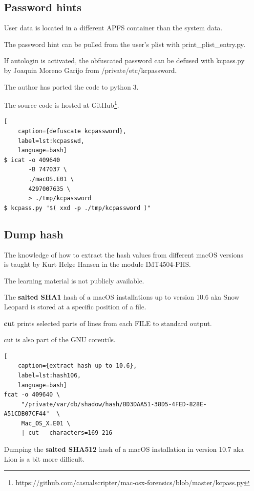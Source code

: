 \subsection{Password hints}

User data is located in a different APFS container than the system data.

The password hint can be pulled from the user's plist with print\_plist\_entry.py.

If autologin is activated, the obfuscated password can be defused with kcpass.py by Joaquin Moreno Garijo from /private/etc/kcpassword.

The author has ported the code to python 3.

The source code is hosted at GitHub\footnote{https://github.com/casualscripter/mac-osx-forensics/blob/master/kcpass.py}.

\begin{lstlisting}[
    caption={defuscate kcpassword},
    label=lst:kcpasswd,
    language=bash]
$ icat -o 409640 
       -B 747037 \
       ./macOS.E01 \
       4297007635 \
       > ./tmp/kcpassword
$ kcpass.py "$( xxd -p ./tmp/kcpassword )"
\end{lstlisting}

\subsection{Dump hash}

The knowledge of how to extract the hash values from different macOS versions is taught by Kurt Helge Hansen in the module IMT4504-PHS.

The learning material is not publicly available.

The \textbf{salted SHA1} hash of a macOS installations up to version 10.6 aka Snow Leopard is stored at a specific position of a file.

\textbf{cut} prints selected parts of lines from each FILE to standard output.

cut is also part of the GNU coreutils.

\begin{lstlisting}[
    caption={extract hash up to 10.6},
    label=lst:hash106,
    language=bash]
fcat -o 409640 \
     "/private/var/db/shadow/hash/BD3DAA51-38D5-4FED-828E-A51CDB07CF44"  \
     Mac_OS_X.E01 \
     | cut --characters=169-216
\end{lstlisting}

Dumping the \textbf{salted SHA512} hash of a macOS installation in version 10.7 aka Lion is a bit more difficult.

